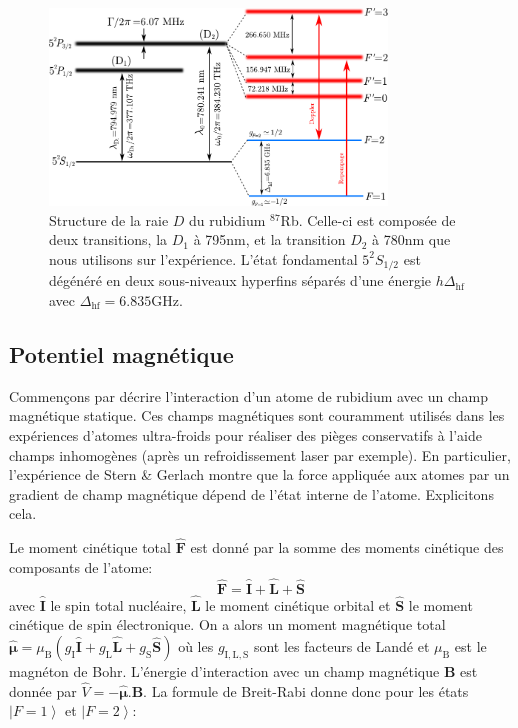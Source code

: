 \begin{figure}
\centering
\includegraphics[width=0.8\textwidth]{Fig/BEC_manip/Rb87.pdf}
\caption{Structure de la raie $D$ du rubidium ${}^{87}$Rb. Celle-ci est composée de deux transitions, la $D_1$ à 795nm, et la transition $D_2$ à 780nm que nous utilisons sur l'expérience. L'état fondamental $5^2S_{1/2}$ est dégénéré en deux sous-niveaux hyperfins séparés d'une énergie $h \Delta_{\mathrm{hf}}$ avec $\Delta_{\mathrm{hf}}=6.835$GHz.}
\label{fig:Rb87}
\end{figure}

\subsection{Potentiel magnétique}
Commençons par décrire l'interaction d'un atome de rubidium avec un champ magnétique statique. Ces champs magnétiques sont couramment utilisés dans les expériences d'atomes ultra-froids pour réaliser des pièges conservatifs à l'aide champs inhomogènes (après un refroidissement laser par exemple). En particulier, l'expérience de Stern \& Gerlach montre que la force appliquée aux atomes par un gradient de champ magnétique dépend de l'état interne de l'atome. Explicitons cela.

Le moment cinétique total $\hat{\mathbf{F}}$ est donné par la somme des moments cinétique des composants de l'atome:
\begin{equation}
\hat{\mathbf{F}}=\hat{\mathbf{I}}+\hat{\mathbf{L}}+\hat{\mathbf{S}}
\end{equation}
avec $\hat{\mathbf{I}}$ le spin total nucléaire, $\hat{\mathbf{L}}$ le moment cinétique orbital et $\hat{\mathbf{S}}$ le moment cinétique de spin électronique. On a alors un moment magnétique total $\hat{\boldsymbol\mu}=\mu_{\mathrm{B}} (g_{\mathrm{I}} \hat{\mathbf{I}} + g_{\mathrm{L}} \hat{\mathbf{L}} + g_{\mathrm{S}} \hat{\mathbf{S}})$ où les $g_{\mathrm{I},\mathrm{L},\mathrm{S}}$ sont les facteurs de Landé et $\mu_{\mathrm{B}}$ est le magnéton de Bohr. L'énergie d'interaction avec un champ magnétique $\mathbf{B}$ est donnée par $\hat{V}=-\hat{\boldsymbol\mu}.\mathbf{B}$. La formule de Breit-Rabi donne donc pour les états $\left| F=1 \right\rangle$ et $\left| F=2 \right\rangle$:

